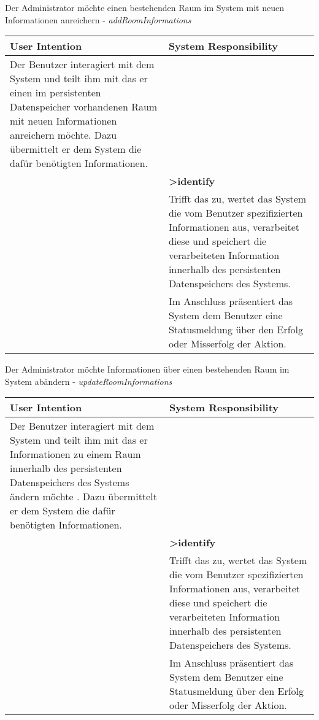 \begin{table}[h]
	Der Administrator möchte einen bestehenden Raum im System mit neuen Informationen anreichern - \textit{addRoomInformations}\\
	\begin{tabularx}{\textwidth}{|X|X|}
	\rowcolor{heading} \textbf{User Intention} & \textbf{System Responsibility}\\ \hline
	Der Benutzer interagiert mit dem System und teilt ihm mit das er einen im persistenten Datenspeicher vorhandenen Raum mit neuen Informationen anreichern möchte. Dazu übermittelt er dem System die dafür benötigten Informationen. & \\  \hline
	 & \textbf{>identify} \\ \hline
	 & Trifft das zu, wertet das System die vom Benutzer spezifizierten Informationen aus, verarbeitet diese und speichert die verarbeiteten Information innerhalb des persistenten Datenspeichers des Systems.\\ \hline
	 & Im Anschluss präsentiert das System dem Benutzer eine Statusmeldung über den Erfolg oder Misserfolg der Aktion.\\ \hline
	\end{tabularx}
	
	Der Administrator möchte Informationen über einen bestehenden Raum im System abändern - \textit{updateRoomInformations}\\
	\begin{tabularx}{\textwidth}{|X|X|}
	\rowcolor{heading} \textbf{User Intention} & \textbf{System Responsibility}\\ \hline
	Der Benutzer interagiert mit dem System und teilt ihm mit das er Informationen zu einem Raum innerhalb des persistenten Datenspeichers des Systems ändern möchte . Dazu übermittelt er dem System die dafür benötigten Informationen. & \\  \hline
	 & \textbf{>identify} \\ \hline
	 & Trifft das zu, wertet das System die vom Benutzer spezifizierten Informationen aus, verarbeitet diese und speichert die verarbeiteten Information innerhalb des persistenten Datenspeichers des Systems.\\ \hline
	 & Im Anschluss präsentiert das System dem Benutzer eine Statusmeldung über den Erfolg oder Misserfolg der Aktion.\\ \hline
	\end{tabularx}
\end{table}
\clearpage

